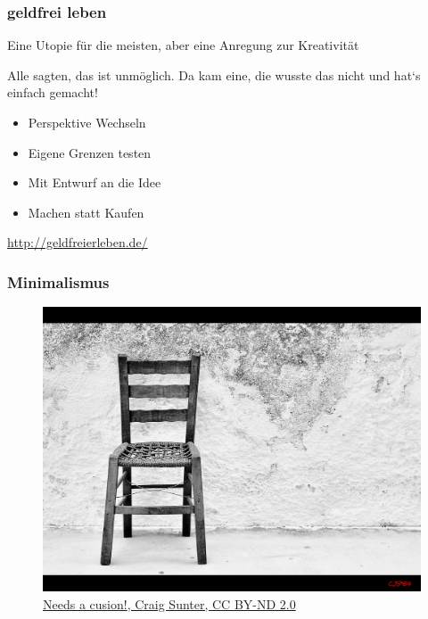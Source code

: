 \begin{frame}
	\frametitle{geldfrei leben}
Eine Utopie für die meisten, aber eine Anregung zur Kreativität

{Alle sagten, das ist unmöglich. Da kam eine, die wusste das nicht und hat‘s einfach gemacht!}

	\begin{itemize}
		\item<1-> Perspektive Wechseln
		\item<2-> Eigene Grenzen testen
		\item<3-> Mit Entwurf an die Idee
		\item<4-> Machen statt Kaufen
	\end{itemize}
	\begin{center}
		\url{http://geldfreierleben.de/}
	\end{center}
\end{frame}

\begin{frame}
	\frametitle{Minimalismus}

	\begin{figure}
		\includegraphics[height=0.7\textheight]{img/icecoldminimalism.jpg}
		\caption[Needs a cusion! by Craig Sunter]{\href{https://flic.kr/p/nT2jEf}{{Needs a cusion!}, Craig Sunter, CC BY-ND 2.0}}
	\end{figure}
\end{frame}

